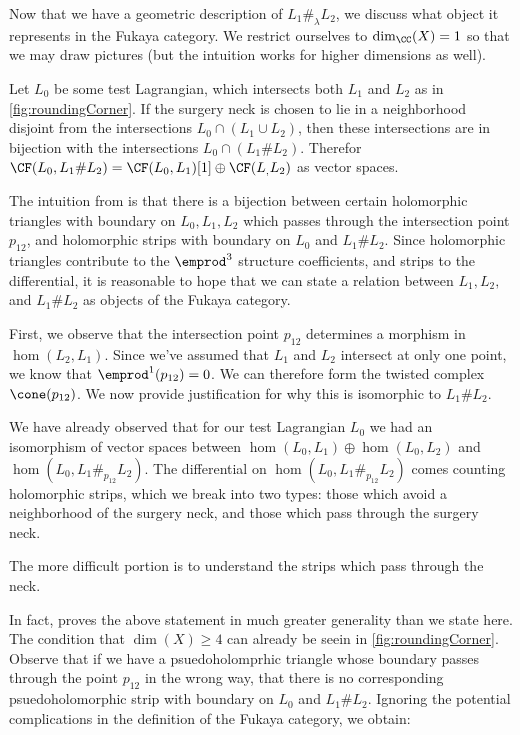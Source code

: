 


Now that we have a geometric description of $L_1\#_\lambda L_2$, we discuss what object it represents in the Fukaya category. We restrict ourselves to $\dim_\CC(X)=1$ so that we may draw pictures (but the intuition works for higher dimensions as well).

Let $L_0$ be some test Lagrangian, which intersects both $L_1$ and $L_2$ as in \cref{fig:roundingCorner}. If the surgery neck is chosen to lie in a neighborhood disjoint from the intersections  $L_0\cap (L_1\cup L_2)$, then these intersections are in bijection with the intersections $L_0\cap (L_1\# L_2)$. Therefor $\CF(L_0, L_1\# L_2)=\CF(L_0, L_1)[1]\oplus \CF(L_, L_2)$ as vector spaces.

 The intuition from \cite{fukaya2007lagrangian} is that there is a bijection between certain holomorphic triangles with boundary on $L_0, L_1, L_2$ which passes through the intersection point $p_{12}$, and holomorphic strips with boundary on $L_0$ and $L_1\# L_2$. Since holomorphic triangles contribute to the $\emprod^3$ structure coefficients, and strips to the differential, it is reasonable to hope that we can state a relation between $L_1, L_2,$ and $L_1\#L_2$ as objects of the Fukaya category.


First, we observe that the intersection point $p_{12}$ determines a morphism in $\hom(L_2, L_1)$. Since we've assumed that $L_1$ and $L_2$ intersect at only one point, we know that $\emprod^1(p_{12})=0$. We can therefore form the twisted complex $\cone(p_{12})$. We now provide justification for why this is isomorphic to $L_1\# L_2$.

We have already observed that for our test Lagrangian $L_0$ we had an isomorphism of vector spaces between $\hom(L_0, L_1)\oplus \hom(L_0, L_2)$ and $\hom(L_0, L_1\#_{p_{12}}L_2)$. The differential on $\hom(L_0, L_1\#_{p_{12}}L_2)$ comes counting holomorphic strips, which we break into two types: those which avoid a neighborhood of the surgery neck, and those which pass through the surgery neck. 

The more difficult portion is to understand the strips which pass through the neck.

In fact, \cite{fukaya2007lagrangian} proves the above statement in much greater generality than we state here. The condition that $\dim(X)\geq 4$ can already be seein in \cref{fig:roundingCorner}. Observe that if we have a psuedoholomprhic triangle whose boundary passes through the point $p_{12}$ in the wrong way, that there is no corresponding psuedoholomorphic strip with boundary on $L_0$ and $L_1\# L_2$.
Ignoring the potential complications in the definition of the Fukaya category, we obtain:

